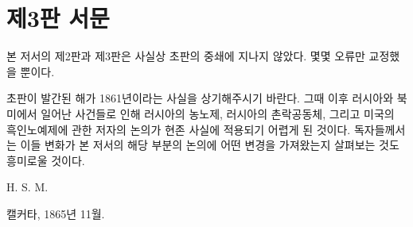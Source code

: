 \chapter{제3판 서문}

본 저서의 제2판과 제3판은
사실상 초판의 중쇄에 지나지 않았다.
몇몇 오류만 교정했을 뿐이다.

초판이 발간된 해가 1861년이라는 사실을 상기해주시기 바란다.
그때 이후 러시아와 북미에서 일어난 사건들로 인해
러시아의 농노제, 러시아의 촌락공동체,
그리고 미국의 흑인노예제에 관한 저자의 논의가
현존 사실에 적용되기 어렵게 된 것이다.
독자들께서는
이들 변화가 본 저서의 해당 부분의 논의에 어떤 변경을 가져왔는지
살펴보는 것도 흥미로울 것이다.

\begin{flushright}
H. S. M.
\end{flushright}

\begin{footnotesize}
캘커타, 1865년 11월.
\end{footnotesize}


